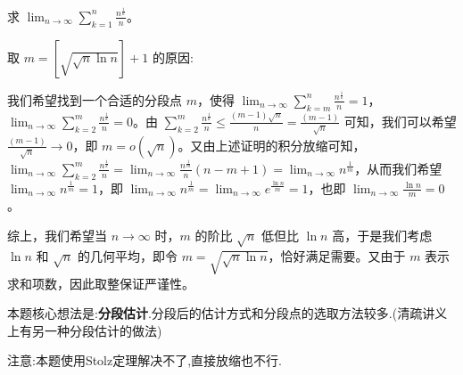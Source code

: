 \documentclass[../../main.tex]{subfiles}
\begin{document}
\begin{example}
求 \(\lim_{n\rightarrow \infty}\sum_{k = 1}^n\frac{n^{\frac{1}{k}}}{n}\)。


\end{example}
\begin{remark}
\hypertarget{取m的原因}{取 \(m = [\sqrt{\sqrt{n}\ln n}]+1\) 的原因:}我们希望找到一个合适的分段点 \(m\)，使得 \(\lim_{n\rightarrow \infty}\sum_{k = m}^n\frac{n^{\frac{1}{k}}}{n}=1\)，\(\lim_{n\rightarrow \infty}\sum_{k = 2}^m\frac{n^{\frac{1}{k}}}{n}=0\)。由 \(\sum_{k = 2}^m\frac{n^{\frac{1}{k}}}{n}\leqslant \frac{(m - 1)\sqrt{n}}{n}=\frac{(m - 1)}{\sqrt{n}}\) 可知，我们可以希望 \(\frac{(m - 1)}{\sqrt{n}}\rightarrow 0\)，即 \(m = o(\sqrt{n})\)。又由上述证明的积分放缩可知，\(\lim_{n\rightarrow \infty}\sum_{k = 2}^m\frac{n^{\frac{1}{k}}}{n}=\lim_{n\rightarrow \infty}\frac{n^{\frac{1}{m}}}{n}(n - m + 1)=\lim_{n\rightarrow \infty}n^{\frac{1}{m}}\)，从而我们希望 \(\lim_{n\rightarrow \infty}n^{\frac{1}{m}}=1\)，即 \(\lim_{n\rightarrow \infty}n^{\frac{1}{m}}=\lim_{n\rightarrow \infty}e^{\frac{\ln n}{m}}=1\)，也即 \(\lim_{n\rightarrow \infty}\frac{\ln n}{m}=0\)。

综上，我们希望当 \(n\rightarrow \infty\) 时，\(m\) 的阶比 \(\sqrt{n}\) 低但比 \(\ln n\) 高，于是我们考虑 \(\ln n\) 和 \(\sqrt{n}\) 的几何平均，即令 \(m=\sqrt{\sqrt{n}\ln n}\)，恰好满足需要。又由于 \(m\) 表示求和项数，因此取整保证严谨性。
\end{remark}
\begin{note}
本题核心想法是:\textbf{分段估计}.分段后的估计方式和分段点的选取方法较多.(清疏讲义上有另一种分段估计的做法)

注意:本题使用Stolz定理解决不了,直接放缩也不行.
\end{note}
\end{document}
